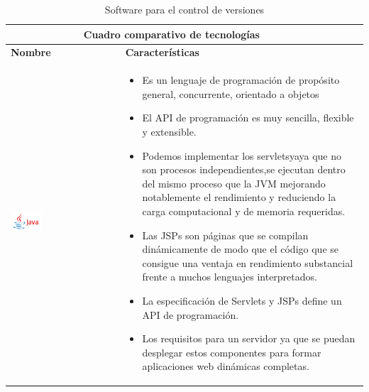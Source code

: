 \begin{table}[b!]
    \centering
    \vspace{-30mm}
      \begin{tabular}{|p{2cm}|ll}
        \hline
        
        \multicolumn{2}{|c|}{{\bf Cuadro comparativo de tecnologías}} \\ 
        \hline
          \multicolumn{1}{|p{4cm}|}{{\bf Nombre}} & 
		  \multicolumn{1}{p{10cm}|}{{\bf Características}}\\

        \hline
          \multicolumn{1}{|p{5cm}|}{\includegraphics[width=0.3\textwidth]{images/java}} & 
          \multicolumn{2}{p{10cm}|}{\begin{itemize}
          \vspace{-25mm}
        \item Es un lenguaje de programación de propósito general, concurrente, orientado a objetos 
        \item El API de programación es muy sencilla, flexible y extensible.
        \item Podemos implementar los servletsyaya que no son procesos independientes,se ejecutan dentro del mismo proceso que la JVM mejorando notablemente el rendimiento y reduciendo la carga computacional y de memoria requeridas.
		\item Las JSPs son páginas que se compilan dinámicamente de modo que el código que se consigue una ventaja en rendimiento substancial frente a muchos lenguajes interpretados.
         \item La especificación de Servlets y JSPs define un API de programación.
         \item Los requisitos para un servidor ya que se puedan desplegar estos componentes para formar aplicaciones web dinámicas completas. \cite{40}
       
      \end{itemize}} \\
        \hline
        
      \end{tabular}
      \caption{Software para el control de versiones}
      \label{Cuadro Comparativo de software para la gestión y construcción de proyectos}
    \end{table}
